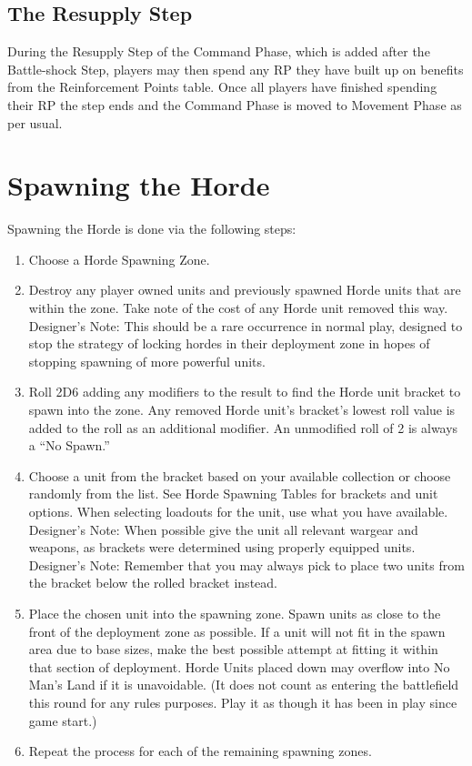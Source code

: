 \documentclass{HordeModeTarot}
\begin{document}
\subsection{The Resupply Step }
During the Resupply Step of the Command Phase, which is added after the Battle-shock Step, players may then spend any RP they have built up on benefits from the Reinforcement Points table.  Once all players have finished spending their RP the step ends and the Command Phase is moved to Movement Phase as per usual.

\section{Spawning the Horde}
Spawning the Horde is done via the following steps: 
\begin{enumerate}
\item Choose a Horde Spawning Zone.
\item Destroy any player owned units and previously spawned Horde units that are within the zone. Take note of the cost of any Horde unit removed this way. 
Designer’s Note: This should be a rare occurrence in normal play, designed to stop the strategy of locking hordes in their deployment zone in hopes of stopping spawning of more powerful units.  
\item Roll 2D6 adding any modifiers to the result to find the Horde unit bracket to spawn into the zone. Any removed Horde unit’s bracket’s lowest roll value is added to the roll as an additional modifier. An unmodified roll of 2 is always a “No Spawn.”
\item Choose a unit from the bracket based on your available collection or choose randomly from the list. See Horde Spawning Tables for brackets and unit options. When selecting loadouts for the unit, use what you have available.  
Designer’s Note: When possible give the unit all relevant wargear and weapons, as brackets were determined using properly equipped units.
Designer’s Note: Remember that you may always pick to place two units from the bracket below the rolled bracket instead.
\item Place the chosen unit into the spawning zone. Spawn units as close to the front of the deployment zone as possible. If a unit will not fit in the spawn area due to base sizes, make the best possible attempt at fitting it within that section of deployment. Horde Units placed down may overflow into No Man’s Land if it is unavoidable. (It does not count as entering the battlefield this round for any rules purposes. Play it as though it has been in play since game start.)
\item Repeat the process for each of the remaining spawning zones.
\end{enumerate}
\end{document}
